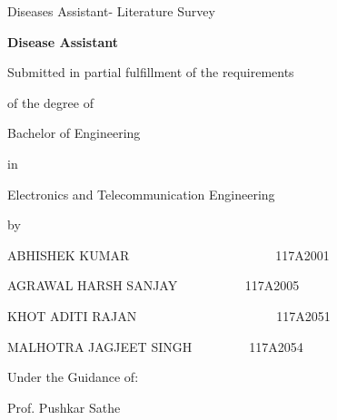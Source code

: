 \documentclass[12pt]{article}
\begin{document}
\begin{Center}
Diseases Assistant- Literature Survey
\end{Center}
\begin{Center}
\textbf{Disease Assistant}
\end{Center}
\begin{Center}
Submitted in partial fulfillment of the requirements
\end{Center}
\begin{Center}
of the degree of
\end{Center}

\vspace{\baselineskip}
\begin{Center}
Bachelor of Engineering
\end{Center}
\begin{Center}
in
\end{Center}
\setlength{\parskip}{18.0pt}
\begin{Center}
Electronics and Telecommunication Engineering
\end{Center}
\begin{Center}
by
\end{Center}
\setlength{\parskip}{9.96pt}
\begin{Center}
ABHISHEK KUMAR{\fontsize{14pt}{16.8pt}\selectfont \ \ \ \ \ \ \ \ \ \ \ \ \ \ \ \ \ \ \ \ \ \ \  117A2001}
\end{Center}
\begin{Center}
AGRAWAL HARSH SANJAY {\fontsize{14pt}{16.8pt}\selectfont \ \ \ \ \ \ \ \ \ \  117A2005}
\end{Center}
\begin{Center}
KHOT ADITI RAJA{\fontsize{14pt}{16.8pt}\selectfont N\ \ \ \ \ \ \ \ \ \ \ \ \ \ \ \ \ \ \ \ \ \  117A2051}
\end{Center}
\begin{Center}
MALHOTRA JAGJEET SINGH{\fontsize{14pt}{16.8pt}\selectfont \ \ \ \ \ \ \ \ \  117A2054}
\end{Center}

\vspace{\baselineskip}
\begin{Center}
Under the Guidance of:
\end{Center}
\begin{Center}
{\fontsize{14pt}{16.8pt}\selectfont Prof. Pushkar Sathe}
\end{Center}


\end{document}
